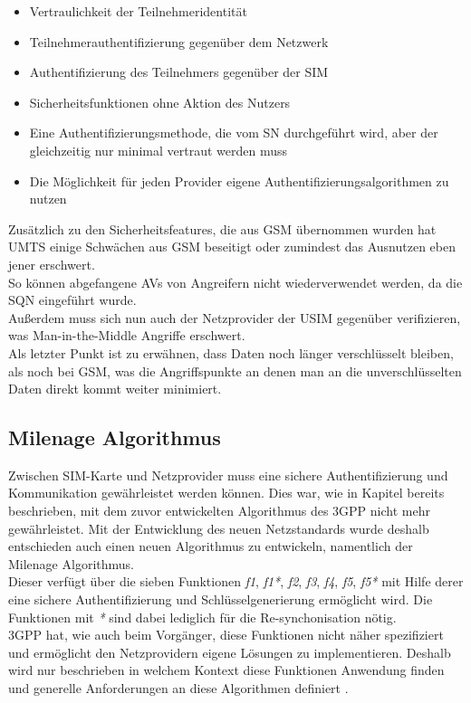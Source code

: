  \begin{itemize}
  \item Vertraulichkeit der Teilnehmeridentität
  \item Teilnehmerauthentifizierung gegenüber dem Netzwerk
  \item Authentifizierung des Teilnehmers gegenüber der SIM
  \item Sicherheitsfunktionen ohne Aktion des Nutzers
  \item Eine Authentifizierungsmethode, die vom \ac{SN} durchgeführt wird, aber der gleichzeitig nur minimal vertraut werden muss
  \item Die Möglichkeit für jeden Provider eigene Authentifizierungsalgorithmen zu nutzen
 \end{itemize}
 
 Zusätzlich zu den Sicherheitsfeatures, die aus GSM übernommen wurden hat UMTS einige
 Schwächen aus GSM beseitigt oder zumindest das Ausnutzen eben jener erschwert. \\
 So können abgefangene \acp{AV} von Angreifern nicht wiederverwendet werden, da
 die SQN eingeführt wurde. \cite{putz01}\\
 Außerdem muss sich nun auch der Netzprovider der USIM gegenüber verifizieren, was
 Man-in-the-Middle Angriffe erschwert. \cite{putz01} \\
 Als letzter Punkt ist zu erwähnen, dass Daten noch länger verschlüsselt bleiben, als noch
 bei GSM, was die Angriffspunkte an denen man an die unverschlüsselten Daten direkt
 kommt weiter minimiert. \cite{spitz11}

\subsection{Milenage Algorithmus}
\label{milenage}
Zwischen \ac{SIM}-Karte und Netzprovider muss eine sichere Authentifizierung und
Kommunikation gewährleistet werden können. Dies war, wie in Kapitel 
bereits beschrieben, mit dem zuvor entwickelten Algorithmus des \ac{3GPP} nicht mehr
gewährleistet. Mit der Entwicklung des neuen Netzstandards wurde deshalb entschieden
auch einen neuen Algorithmus zu entwickeln, namentlich der Milenage Algorithmus. \\
Dieser verfügt über die sieben Funktionen \emph{f1}, \emph{f1*}, \emph{f2}, \emph{f3},
\emph{f4}, \emph{f5}, \emph{f5*} mit Hilfe derer eine sichere Authentifizierung und
Schlüsselgenerierung ermöglicht wird. Die Funktionen mit \emph{*} sind dabei lediglich für die
Re-synchonisation nötig. \\
3GPP hat, wie auch beim Vorgänger, diese Funktionen nicht näher spezifiziert und ermöglicht
den Netzprovidern eigene Lösungen zu implementieren. Deshalb wird nur beschrieben in
welchem Kontext diese Funktionen Anwendung finden und generelle Anforderungen
an diese Algorithmen definiert \cite{3gpp.35.205}.

